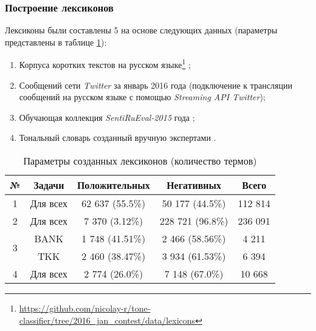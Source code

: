 \subsubsection{Построение лексиконов}

Лексиконы были составлены 5 на основе следующих данных (параметры представлены
в таблице \ref{table:createdLexicons}):

\begin{enumerate}
    \item Корпуса коротких текстов на русском языке\footnote{
            \url{https://github.com/nicolay-r/tone-classifier/tree/2016_jan_contest/data/lexicons}
    }
    \cite{rubtsovaCollection};
    \item Сообщений сети {\it Twitter }  за январь 2016 года (подключение к трансляции
        сообщений на русском языке с помощью {\it Streaming API Twitter});
    \item Обучающая коллекция {\it SentiRuEval-2015} года \cite{dialog2015};
    \item Тональный словарь созданный вручную экспертами \cite{expertLexicon}.
\end{enumerate}

\begin{table}[ht!]
\centering
\caption{Параметры созданных лексиконов (количество термов)}
\label{table:createdLexicons}
\begin{tabular}{|c|c|c|c|c|}
\hline
№                  & \multicolumn{1}{c|}{Задачи} & \multicolumn{1}{c|}{Положительных} & \multicolumn{1}{c|}{Негативных} & \multicolumn{1}{c|}{Всего} \\ \hline
1                  & Для всех                    & 62 637 (55.5\%)                              & 50 177 (44.5\%)                         & 112 814                            \\ \hline
2                  & Для всех                    & 7 370 (3.12\%)                               & 228 721 (96.8\%)                        & 236 091                            \\ \hline
\multirow{2}{*}{3} & BANK                        & 1 748 (41.51\%)                              & 2 466 (58.56\%)                         & 4 211                              \\ \cline{2-5}
                   & TKK                         & 2 460 (38.47\%)                              & 3 934 (61.53\%)                         & 6 394                              \\ \hline
4                  & Для всех                    & 2 774 (26.0\%)                               & 7 148 (67.0\%)                          & 10 668                             \\ \hline
\end{tabular}
\end{table}

